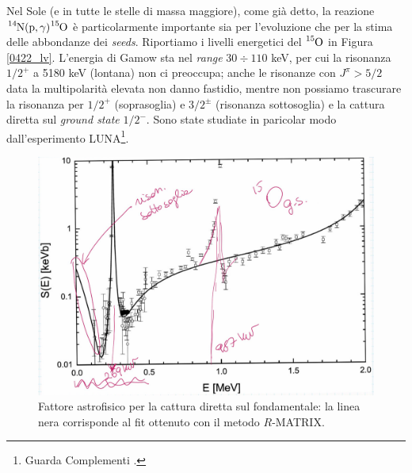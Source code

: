 \noindent Nel Sole (e in tutte le stelle di massa maggiore), come già detto, la reazione $\ce{^{14}N(p,\gamma)\ce{^{15}O}}$ è particolarmente importante sia per l'evoluzione che per la stima delle abbondanze dei \textit{seeds}. Riportiamo i livelli energetici del $\ce{^{15}O}$ in Figura \ref{0422_lv}. L'energia di Gamow sta nel \textit{range} $30\div 110$ keV, per cui la risonanza $1/2^+$ a 5180 keV (lontana) non ci preoccupa; anche le risonanze con $J^\pi> 5/2$ data la multipolarità elevata non danno fastidio, mentre non possiamo trascurare la risonanza per $1/2^+$ (soprasoglia) e $3/2^\pm$ (risonanza sottosoglia) e la cattura diretta sul \textit{ground state} $1/2^-$. Sono state studiate in paricolar modo dall'esperimento LUNA\footnote{Guarda Complementi .}.

\begin{figure}[h]
	\centering
	\includegraphics[scale=0.5]{Immagini/0422_0-Se.png}
	\caption{Fattore astrofisico per la cattura diretta sul fondamentale: la linea nera corrisponde al fit ottenuto con il metodo $R$-MATRIX.}
	\label{0422_cattura}
\end{figure}

